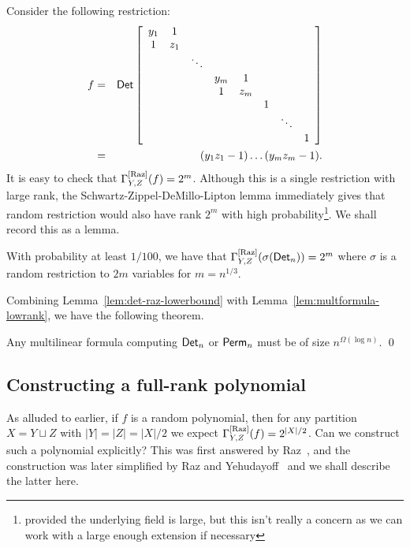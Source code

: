 Consider the following restriction:
\begin{eqnarray*}
f & = & \mathsf{Det} \left[ \begin{array}{cccccccc}
y_1 & 1   &        &     &     &  &        &   \\
1   & z_1 &        &     &     &  &        &   \\
    &     & \ddots &     &     &  &        &   \\
    &     &        & y_m &1    &  &        &   \\
    &     &        & 1   &z_m  &  &        &   \\
    &     &        &     &     & 1&        &   \\
    &     &        &     &     &  & \ddots &   \\
    &     &        &     &     &  &        & 1
  \end{array}\right]\\
 &= & (y_1z_1 - 1)\dots (y_mz_m - 1).
\end{eqnarray*}
It is easy to check that $\Gamma^{\mathrm{[Raz]}}_{Y,Z}(f) = 2^m$. Although this is a single restriction with large rank, the Schwartz-Zippel-DeMillo-Lipton lemma immediately gives that random restriction would also have rank $2^m$ with high probability\footnote{provided the underlying field is large, but this isn't really a concern as we can work with a large enough extension if necessary}. We shall record this as a lemma. 

\begin{lemma}\label{lem:det-raz-lowerbound}
With probability at least $1/100$, we have that $\Gamma^{\mathrm{[Raz]}}_{Y,Z}(\sigma(\mathsf{Det}_n)) = 2^m$ where $\sigma$ is a random restriction to $2m$ variables for $m = n^{1/3}$. 
\end{lemma}


Combining Lemma~\ref{lem:det-raz-lowerbound} with Lemma~\ref{lem:multformula-lowrank}, we have the following theorem. 

\begin{theorem} Any multilinear formula computing $\mathsf{Det}_n$ or $\mathsf{Perm}_n$ must be of size $n^{\Omega(\log n)}$. \qed
\end{theorem}

\subsection{Constructing a full-rank polynomial}\label{sec:fullrankpoly}

As alluded to earlier,  if $f$ is a random polynomial, then for any partition $X = Y \sqcup Z$ with $|Y| = |Z| = |X|/2$ we expect $\Gamma^{\mathrm{[Raz]}}_{Y,Z}(f) = 2^{|X|/2}$. Can we construct such a polynomial explicitly? This was first answered by Raz~\cite{Raz06}, and the construction was later simplified by Raz and Yehudayoff~\cite{ry08} and we shall describe the latter here. \\

